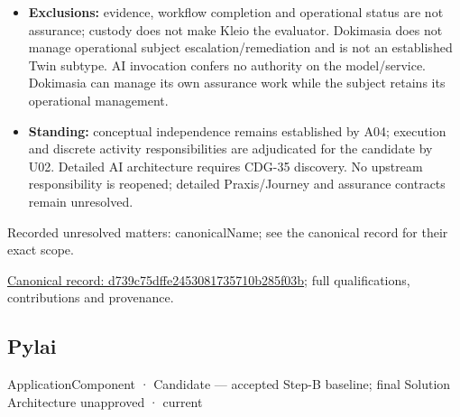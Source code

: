 \begin{itemize}
\item \textbf{Exclusions:} evidence, workflow completion and operational status are not
  assurance; custody does not make Kleio the evaluator. Dokimasia does not manage
  operational subject escalation/remediation and is not an established Twin subtype.
  AI invocation confers no authority on the model/service. Dokimasia can manage
  its own assurance work while the subject retains its operational management.

\item \textbf{Standing:} conceptual independence remains established by A04; execution
  and discrete activity responsibilities are adjudicated for the candidate by U02.
  Detailed AI architecture requires CDG-35 discovery. No upstream responsibility
  is reopened; detailed Praxis/Journey and assurance contracts remain unresolved.

\end{itemize}

{\small Recorded unresolved matters: canonicalName; see the canonical record for their exact scope.}\par
{\footnotesize \href{../../../../continuum/application/application-component/d739c75dffe2453081735710b285f03b.md}{Canonical record: d739c75dffe2453081735710b285f03b}; full qualifications, contributions and provenance.}\par
\subsection{Pylai}

\label{element:e3e4147fea3640198dc251ed41ee854d}
{\small ApplicationComponent · Candidate — accepted Step-B baseline; final Solution Architecture unapproved · current}\par

